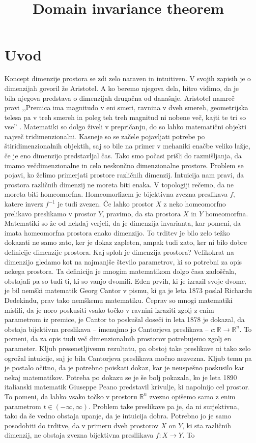 \documentclass[mat1]{fmfdelo}
\title{Domain invariance theorem}
\newcommand{\R}{\mathbb R}
\newcommand{\0}{\underline{0}}
\begin{document}
\section{Uvod}
Koncept dimenzije prostora se zdi zelo naraven in intuitiven. V svojih zapisih je o dimenzijah govoril že Aristotel. A ko beremo njegova dela, hitro vidimo, da je bila njegova predstava o dimenzijah drugačna od današnje. Aristotel namreč pravi ,,Premica ima magnitudo v eni smeri, ravnina v dveh smereh, geometrijska telesa pa v treh smereh in poleg teh treh magnitud ni nobene več, kajti te tri so vse'' \cite[Str. 1, moj prevod]{geometry4}. Matematiki so dolgo živeli v prepričanju, do so lahko matematični objekti največ tridimenzionalni. Kasneje so se začele pojavljati potrebe po štiridimenzionalnih objektih, saj so bile na primer v mehaniki enačbe veliko lažje, če je eno dimenzijo predstavljal čas. Tako smo počasi prišli do razmišljanja, da imamo večdimenzionalne in celo neskončno dimenzionalne prostore. Problem se pojavi, ko želimo primerjati prostore različnih dimenzij. Intuicija nam pravi, da prostora različnih dimenzij ne moreta biti enaka. V topologiji rečemo, da ne moreta biti homeomorfna. Homeomorfizem je bijektivna zvezna preslikava $f$, katere inverz $f^{-1}$ je tudi zvezen. Če lahko prostor $X$ z neko homeomorfno prelikavo preslikamo v prostor $Y$, pravimo, da sta prostora $X$ in $Y$ homeomorfna. Matematiki so že od nekdaj verjeli, da je dimenzija invarianta, kar pomeni, da imata homeomorfna prostora enako dimenzijo. To trditev je bilo zelo težko dokazati ne samo zato, ker je dokaz zapleten, ampak tudi zato, ker ni bilo dobre definicije dimenzije prostora. Kaj sploh je dimenzija prostora? Velikokrat na dimenzijo gledamo kot na najmanjše število parametrov, ki so potrebni za opis nekega prostora. Ta definicija je mnogim matematikom dolgo časa zadoščala, obstajali pa so tudi ti, ki so vanjo dvomili. Eden prvih, ki je izrazil svoje dvome, je bil nemški matematik Georg Cantor v pismu, ki ga je leta 1873 poslal Richardu Dedekindu, prav tako nemškemu matematiku. Čeprav so mnogi matematiki mislili, da je noro poskusiti vsako točko v ravnini izraziti zgolj z enim parametrom iz premice, je Cantor to poskušal doseči in leta 1878 je dokazal, da obstaja bijektivna preslikava -- imenujmo jo Cantorjeva preslikava -- $c : \R \to \R^n$. To pomeni, da za opis tudi več dimenzionalnih prostorov potrebujemo zgolj en parameter. Kljub presenetljivemu rezultatu, pa obstoj take preslikave ni tako zelo ogrožal intuicije, saj je bila Cantorjeva preslikava močno nezvezna. Kljub temu pa je postalo očitno, da je potrebno poiskati dokaz, kar je neuspešno poskusilo kar nekaj matematikov. Potreba po dokazu se je še bolj pokazala, ko je leta 1890 italianski matematik Giuseppe Peano predstavil krivulje, ki napolnijo cel prostor. To pomeni, da lahko vsako točko v prostoru $\R^n$ zvezno opišemo samo z enim parametrom $t \in (-\infty, \infty)$. Problem take preslikave pa je, da ni surjektivna, tako da še vedno obstaja upanje, da je intuicija dobra. Potrebno jo je samo posodobiti do trditve, da v primeru dveh prostorov $X$ on $Y$, ki sta različnih dimenzij, ne obstaja zvezna bijektivna presllikava $f : X \to Y$. To 
\end{document}
